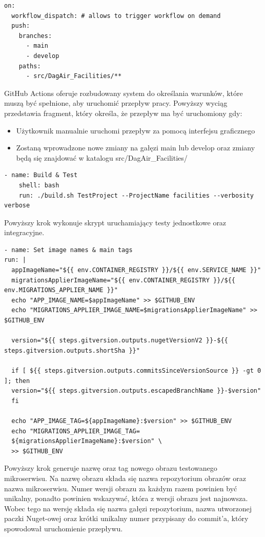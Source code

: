 \documentclass[11pt, a4]{article} %
\begin{document}
\begin{lstlisting}
on:
  workflow_dispatch: # allows to trigger workflow on demand
  push:
    branches: 
      - main
      - develop
    paths:
      - src/DagAir_Facilities/**
\end{lstlisting}

GitHub Actions oferuje rozbudowany system do określania warunków, które muszą być 
spełnione, aby uruchomić przepływ pracy. Powyższy wyciąg przedstawia fragment, który 
określa, że przepływ ma być uruchomiony gdy:

\begin{itemize} %
    \item Użytkownik manualnie uruchomi przepływ za pomocą interfejsu graficznego
    \item Zostaną wprowadzone nowe zmiany na gałęzi main lub develop oraz zmiany będą 
    się znajdować w katalogu src/DagAir\_Facilities/
\end{itemize}

\begin{lstlisting}
- name: Build & Test
    shell: bash
    run: ./build.sh TestProject --ProjectName facilities --verbosity verbose
\end{lstlisting}

Powyższy krok wykonuje skrypt uruchamiający testy jednostkowe oraz integracyjne.

\begin{lstlisting}
- name: Set image names & main tags
run: |
  appImageName="${{ env.CONTAINER_REGISTRY }}/${{ env.SERVICE_NAME }}"
  migrationsApplierImageName="${{ env.CONTAINER_REGISTRY }}/${{ env.MIGRATIONS_APPLIER_NAME }}"
  echo "APP_IMAGE_NAME=$appImageName" >> $GITHUB_ENV
  echo "MIGRATIONS_APPLIER_IMAGE_NAME=$migrationsApplierImageName" >> $GITHUB_ENV

  version="${{ steps.gitversion.outputs.nugetVersionV2 }}-${{ steps.gitversion.outputs.shortSha }}"

  if [ ${{ steps.gitversion.outputs.commitsSinceVersionSource }} -gt 0 ]; then
  version="${{ steps.gitversion.outputs.escapedBranchName }}-$version"
  fi

  echo "APP_IMAGE_TAG=${appImageName}:$version" >> $GITHUB_ENV
  echo "MIGRATIONS_APPLIER_IMAGE_TAG=
  ${migrationsApplierImageName}:$version" \
  >> $GITHUB_ENV
\end{lstlisting}

Powyższy krok generuje nazwę oraz tag nowego obrazu testowanego mikroserwisu. Na nazwę 
obrazu składa się nazwa repozytorium obrazów oraz nazwa mikroserwisu. Numer wersji 
obrazu za każdym razem powinien być unikalny, ponadto powinien wskazywać, która z 
wersji obrazu jest najnowsza. Wobec tego na wersję składa się nazwa gałęzi 
repozytorium, nazwa utworzonej paczki Nuget-owej oraz krótki unikalny numer przypisany 
do commit'a, który spowodował uruchomienie przepływu.
\end{document}
